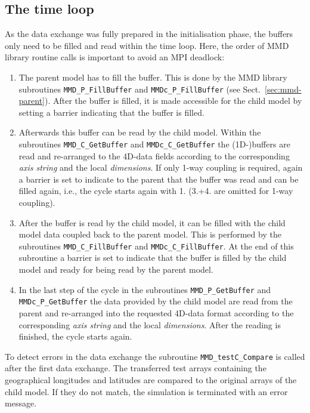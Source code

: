 \documentclass[twoside]{article}
\begin{document}
\subsection{The time loop} \label{ssec:timeloop}
As the data exchange was fully prepared in the initialisation phase,
the buffers only need to be filled and read  within the time 
loop. Here, the order of MMD library routine calls is important to
avoid an MPI deadlock:
\begin{enumerate}
\item The parent model has to fill the buffer. This is done by the MMD library
subroutines \verb|MMD_P_FillBuffer| and \verb|MMDc_P_FillBuffer|
(see Sect.\ \ref{sec:mmd-parent}).
After the buffer is filled, it is made accessible for the child model
by setting a barrier indicating that the buffer is filled. 
\item Afterwards this buffer can be read by the child model.
 Within the subroutines  
\verb|MMD_C_GetBuffer| and \verb|MMDc_C_GetBuffer| the (1D-)buffers
are read and  
re-arranged to the 4D-data fields according to the corresponding {\it axis 
string} and the local {\it dimensions}. 
If only 1-way coupling is required, again a barrier is set to indicate
to the parent that the buffer was read and can be filled again, i.e.,
the cycle starts again with 1. (3.+4. are omitted for 1-way coupling).
\item After the buffer is read by the child model, it can be filled with the
child model data coupled back to the parent model. This is performed by the
subroutines \verb|MMD_C_FillBuffer| and \verb|MMDc_C_FillBuffer|. At
the end of this subroutine a barrier is set to indicate that the
buffer is filled by the child model and ready for being read by the parent model. 
\item In the last step of the cycle in the
subroutines \verb|MMD_P_GetBuffer| and \verb|MMDc_P_GetBuffer| 
the data provided by the child model are read from the parent and
re-arranged into the requested 4D-data format according to the
corresponding {\it axis string} and the local {\it dimensions}. After
the reading is finished, the cycle starts again.
\end{enumerate}

To detect errors in the data exchange the
subroutine \verb|MMD_testC_Compare| is called after the first data exchange.
The transferred test arrays containing the geographical longitudes and
latitudes are compared to the original arrays of the child model. 
If they do not match, the simulation is terminated with an error message.
\end{document}
